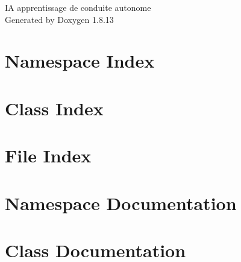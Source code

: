 \documentclass[twoside]{book}
\newcommand{\+}{\discretionary{\mbox{\scriptsize$\hookleftarrow$}}{}{}}
\newcommand{\clearemptydoublepage}{%
  \newpage{\pagestyle{empty}\cleardoublepage}%
}
\begin{document}
\hypersetup{pageanchor=false,
             bookmarksnumbered=true,
             pdfencoding=unicode
            }
\begin{titlepage}
\vspace*{7cm}
\begin{center}%
{\Large IA apprentissage de conduite autonome }\\
\vspace*{1cm}
{\large Generated by Doxygen 1.8.13}\\
\end{center}
\end{titlepage}
\clearemptydoublepage
{}
\tableofcontents
\clearemptydoublepage
{}
\hypersetup{pageanchor=true}

\chapter{Namespace Index}

\chapter{Class Index}

\chapter{File Index}

\chapter{Namespace Documentation}















\chapter{Class Documentation}















\end{document}
